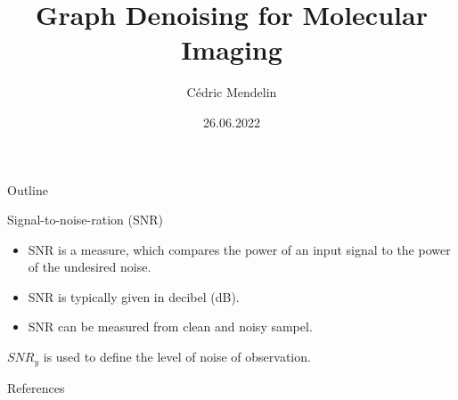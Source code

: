 \documentclass[aspectratio=169]{beamer}
\title              {Graph Denoising for Molecular Imaging}
\author     		{Cédric Mendelin}
\institute          {Department of Mathematics and Computer Science, University of Basel}
\date               {26.06.2022}
\begin{document}

\begin{frame}[t,plain]
    \titlepage
\end{frame}

\begin{frame}[t]{Outline}
    \tableofcontents
\end{frame}



\begin{frame}{Signal-to-noise-ration (SNR)}
    
    \begin{itemize}
        \item SNR is a measure, which compares the power of an input signal to the power of the undesired noise.
        \item SNR is typically given in decibel (dB).
        \item SNR can be measured from clean and noisy sampel.
    \end{itemize}

    \begin{tcolorbox}[colback=red!5!white,hide=<-1>, alert=<2>, colframe=red!75!black]
        $SNR_y$ is used to define the level of noise of observation.
    \end{tcolorbox}

\end{frame}











\backupbegin

\begin{frame}{References}
    \printbibliography
\end{frame}

\backupend
\end{document}
